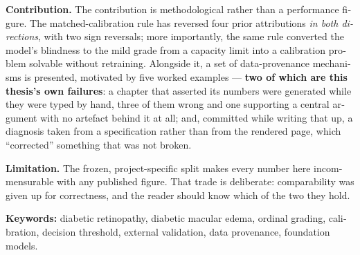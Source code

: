 \begin{latin}
\vspace{0.6em}
\noindent\textbf{Contribution.} The contribution is methodological rather than a performance
figure. The matched-calibration rule has reversed four prior attributions \emph{in both
directions}, with two sign reversals; more importantly, the same rule converted the model's
blindness to the mild grade from a capacity limit into a calibration problem solvable without
retraining. Alongside it, a set of data-provenance mechanisms is presented, motivated by five
worked examples --- \textbf{two of which are this thesis's own failures}: a chapter that
asserted its numbers were generated while they were typed by hand, three of them wrong and one
supporting a central argument with no artefact behind it at all; and, committed while writing
that up, a diagnosis taken from a specification rather than from the rendered page, which
``corrected'' something that was not broken.

\vspace{0.6em}
\noindent\textbf{Limitation.} The frozen, project-specific split makes every number here
incommensurable with any published figure. That trade is deliberate: comparability was given up
for correctness, and the reader should know which of the two they hold.

\vspace{1em}
\noindent\textbf{Keywords:} diabetic retinopathy, diabetic macular edema, ordinal grading,
calibration, decision threshold, external validation, data provenance, foundation models.
\end{latin}
\cleardoublepage
